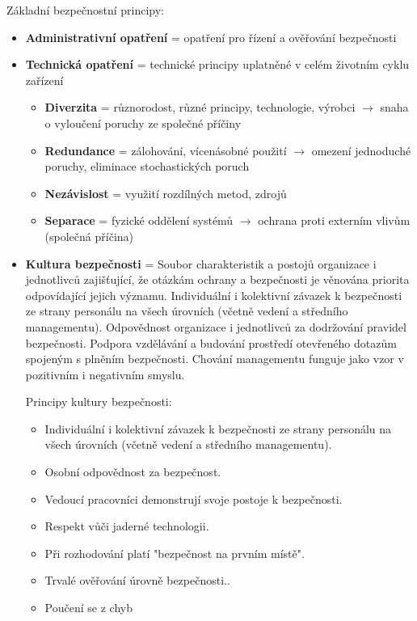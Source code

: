 Základní bezpečnostní principy:

\begin{itemize}    
	\item \textbf{Administrativní opatření} = opatření pro řízení a ověřování bezpečnosti
 
	\item \textbf{Technická opatření} = technické principy uplatněné v celém životním cyklu zařízení
        \begin{itemize}
            \item \textbf{Diverzita} = různorodost, různé principy, technologie, výrobci $\rightarrow$ snaha o vyloučení poruchy ze společné příčiny
             \item \textbf{Redundance} = zálohování, vícenásobné použití $\rightarrow$ omezení jednoduché poruchy, eliminace stochastických poruch
            \item \textbf{Nezávislost} = využití rozdílných metod, zdrojů
            \item \textbf{Separace} = fyzické oddělení systémů $\rightarrow$ ochrana proti externím vlivům (společná příčina)
        \end{itemize}
 
    \item \textbf{Kultura bezpečnosti} = Soubor charakteristik a postojů organizace i jednotlivců zajišťující, že otázkám ochrany a bezpečnosti je věnována priorita odpovídající jejich významu. Individuální i kolektivní závazek k bezpečnosti ze strany personálu na všech úrovních (včetně vedení a středního managementu). Odpovědnost organizace i jednotlivců za dodržování pravidel bezpečnosti. Podpora vzdělávání a budování prostředí otevřeného dotazům spojeným s plněním bezpečnosti. Chování managementu funguje jako vzor v pozitivním i negativním smyslu.

    Principy kultury bezpečnosti:

    \begin{itemize}
        \item Individuální i kolektivní závazek k bezpečnosti ze strany personálu na všech úrovních (včetně vedení a středního managementu).
        \item Osobní odpovědnost za bezpečnost.
        \item Vedoucí pracovníci demonstrují svoje postoje k bezpečnosti.
        \item Respekt vůči jaderné technologii.
        \item Při rozhodování platí "bezpečnost na prvním místě".
        \item Trvalé ověřování úrovně bezpečnosti..
        \item Poučení se z chyb
    \end{itemize}
\end{itemize}


